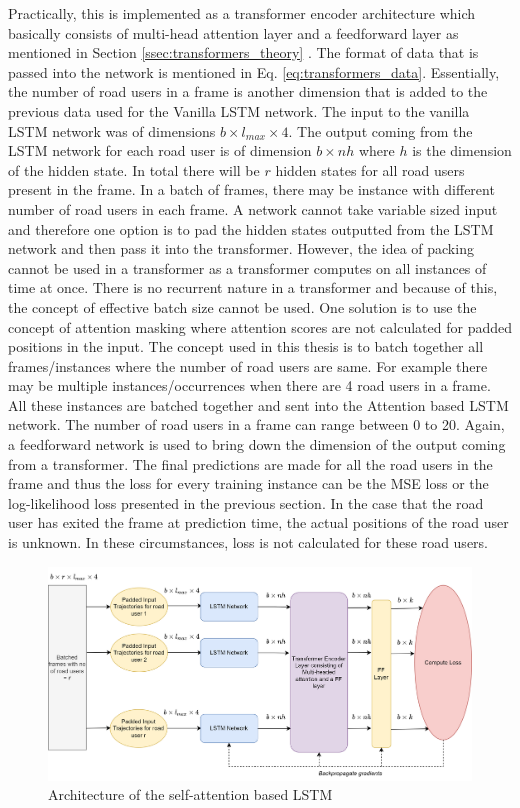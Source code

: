 \documentclass{article}
\begin{document}
Practically, this is implemented as a transformer encoder architecture which basically consists of multi-head attention layer and a feedforward layer as mentioned in Section \ref{ssec:transformers_theory} .
The format of data that is passed into the network is mentioned in Eq. \ref{eq:transformers_data}. Essentially, the number of road users in a frame is another dimension that is added to the previous data used for the Vanilla LSTM network. The input to the vanilla LSTM network was of dimensions $b \times l_{max} \times 4$. The output coming from the LSTM network for each road user is of dimension $b \times nh$ where $h$ is the dimension of the hidden state. In total there will be $r$ hidden states for all road users present in the frame. In a batch of frames, there may be instance with different number of road users in each frame. A network cannot take variable sized input and therefore one option is to pad the hidden states outputted from the LSTM network and then pass it into the transformer. However, the idea of packing cannot be used in a transformer as a transformer computes on all instances of time at once. There is no recurrent nature in a transformer and because of this, the concept of effective batch size cannot be used. One solution is to use the concept of attention masking where attention scores are not calculated for padded positions in the input. The concept used in this thesis is to batch together all frames/instances where the number of road users are same. For example there may be multiple instances/occurrences when there are 4 road users in a frame. All these instances are batched together and sent into the Attention based LSTM network. The number of road users in a frame can range between 0 to 20. Again, a feedforward network is used to bring down the dimension of the output coming from a transformer. The final predictions are made for all the road users in the frame and thus the loss for every training instance can be the MSE loss or the log-likelihood loss presented in the previous section. In the case that the road user has exited the frame at prediction time, the actual positions of the road user is unknown. In these  circumstances, loss is not calculated for these road users. 

\begin{figure}[H]
\centering
\includegraphics[scale=0.15]{method/tlstm.png}
\caption{Architecture of the self-attention based LSTM}
\end{figure}
\end{document}
